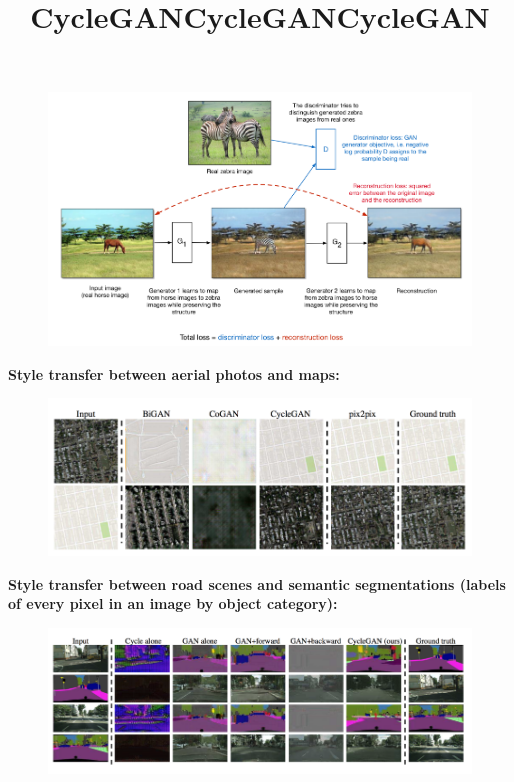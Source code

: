 \begin{frame}
    \title{CycleGAN}
	\begin{figure}[h!]
		\includegraphics[scale=0.40]{images/cyclegan2.png}
	\end{figure}
\end{frame}

\begin{frame}
    \title{CycleGAN}
    \textbf{Style transfer between aerial photos and maps:}
	\begin{figure}[h!]
		\includegraphics[scale=0.40]{images/cyclegan3.png}
	\end{figure}
\end{frame}

\begin{frame}
    \title{CycleGAN}
    \textbf{Style transfer between road scenes and semantic segmentations (labels of every pixel in an image by object category):}
	\begin{figure}[h!]
		\includegraphics[scale=0.40]{images/cyclegan4.png}
	\end{figure}
\end{frame}
